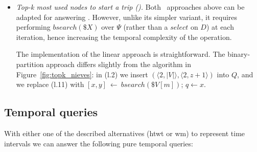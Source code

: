 \begin{itemize}[leftmargin=3mm]
	\item {\em Top-k most used nodes to start a trip (\Stks).}
	Both \Stk\ approaches above can be adapted for answering \Stks.
	However, unlike its simpler variant, it requires performing $bsearch(\$X)$ over $\Psi$ (rather than a $select$ on $D$) at
	each iteration, hence increasing the temporal complexity of the operation.

	The implementation of the linear approach is straightforward. The binary-partition approach differs slightly 
	from the algorithm in Figure~\ref{fig:topk_nieves}: in (l.2) we insert $(\langle 2, |V| \rangle, \langle 2,z+1 \rangle)$ into $Q$, and we 
	replace (l.11) with $[x,y]~\leftarrow~bsearch(\$V[m])$; $q \leftarrow x$.


	\end{itemize}

	\subsection{Temporal queries}
	\label{sec:tq}
	With either one of the described alternatives (\gls{htwt} or \gls{wm}) to represent time intervals
	we can answer the following pure temporal queries:


